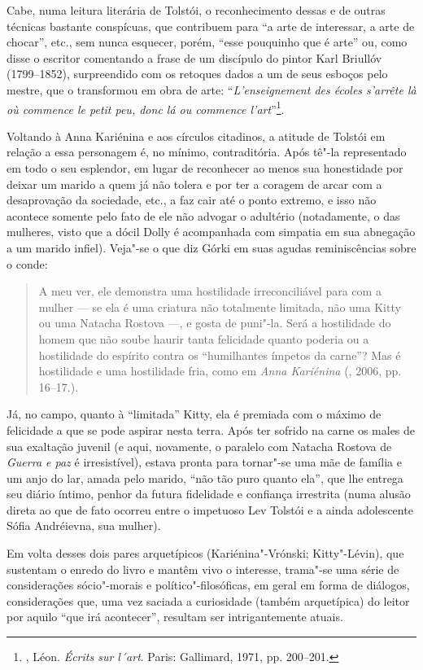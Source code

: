 Cabe, numa leitura literária de Tolstói, o reconhecimento dessas e de
outras técnicas bastante conspícuas, que contribuem para
``a arte de interessar, a arte de chocar'', etc., sem nunca esquecer,
porém, ``esse pouquinho que é arte'' ou, como disse o escritor
comentando a frase de um discípulo do pintor Karl
Briullóv (1799--1852), surpreendido com os retoques dados
a um de seus esboços pelo mestre, que o transformou em obra de arte:
``\emph{L'enseignement des écoles s'arrête là où commence \emph{le petit
peu}, donc lá ou commence l'art}''\footnote{, Léon. \emph{Écrits sur l´art}. Paris: Gallimard, 1971, pp.
200--201.}.

Voltando à Anna Kariénina e aos círculos citadinos, a atitude de
Tolstói em relação a essa personagem é, no mínimo, contraditória. Após
tê"-la representado em todo o seu esplendor, em lugar de reconhecer ao
menos sua honestidade por deixar um marido a quem já não tolera e
por ter a coragem de arcar com a desaprovação da sociedade, etc., a faz
cair até o ponto extremo, e isso não acontece somente pelo fato de ele
não advogar o adultério (notadamente, o das mulheres, visto que a dócil
Dolly é acompanhada com simpatia em sua abnegação a um marido infiel).
Veja"-se o que diz Górki em suas agudas reminiscências sobre o conde:

\begin{quote}
A meu ver, ele demonstra uma hostilidade irreconciliável para com a
mulher --- se ela é uma criatura não totalmente limitada, não uma Kitty
ou uma Natacha Rostova ---, e gosta de puni"-la. Será a hostilidade do
homem que não soube haurir tanta felicidade quanto poderia ou a
hostilidade do espírito contra os ``humilhantes ímpetos da carne''? Mas é
hostilidade e uma hostilidade fria, como em \emph{Anna Kariénina} (, 2006, pp. 16--17.).
\end{quote}

Já, no campo, quanto à ``limitada'' Kitty, ela é premiada com o
máximo de felicidade a que se pode aspirar nesta terra.
Após ter sofrido na carne os males de sua exaltação juvenil (e aqui,
novamente, o paralelo com Natacha Rostova de \emph{Guerra e paz} é
irresistível), estava pronta para tornar"-se uma mãe de família e um anjo do lar,
amada pelo marido, ``não tão puro quanto ela'', que lhe entrega seu diário
íntimo, penhor da futura fidelidade e confiança irrestrita (numa alusão
direta ao que de fato ocorreu entre o impetuoso Lev Tolstói e a ainda
adolescente Sófia Andréievna, sua mulher).

Em volta desses dois pares arquetípicos (Kariénina"-Vrónski; Kitty"-Lévin), que sustentam o enredo do
livro e mantêm vivo o interesse, trama"-se uma série de considerações
sócio"-morais e político"-filosóficas, em geral em forma de diálogos, considerações que,
uma vez saciada a curiosidade (também arquetípica) do leitor por aquilo
``que irá acontecer'', resultam ser intrigantemente atuais.

